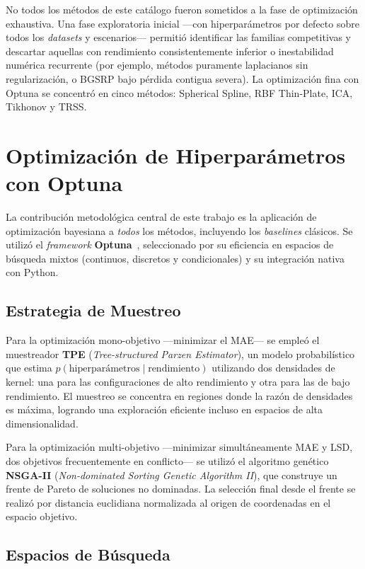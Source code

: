 No todos los métodos de este catálogo fueron sometidos a la fase de optimización exhaustiva. Una fase exploratoria inicial —con hiperparámetros por defecto sobre todos los \textit{datasets} y escenarios— permitió identificar las familias competitivas y descartar aquellas con rendimiento consistentemente inferior o inestabilidad numérica recurrente (por ejemplo, métodos puramente laplacianos sin regularización, o BGSRP bajo pérdida contigua severa). La optimización fina con Optuna se concentró en cinco métodos: Spherical Spline, RBF Thin-Plate, ICA, Tikhonov y TRSS.

\section{Optimización de Hiperparámetros con Optuna}

La contribución metodológica central de este trabajo es la aplicación de optimización bayesiana a \textit{todos} los métodos, incluyendo los \textit{baselines} clásicos. Se utilizó el \textit{framework} \textbf{Optuna}~\cite{akiba2019optuna}, seleccionado por su eficiencia en espacios de búsqueda mixtos (continuos, discretos y condicionales) y su integración nativa con Python.

\subsection{Estrategia de Muestreo}

Para la optimización mono-objetivo —minimizar el MAE— se empleó el muestreador \textbf{TPE} (\textit{Tree-structured Parzen Estimator}), un modelo probabilístico que estima $p(\text{hiperparámetros} \mid \text{rendimiento})$ utilizando dos densidades de kernel: una para las configuraciones de alto rendimiento y otra para las de bajo rendimiento. El muestreo se concentra en regiones donde la razón de densidades es máxima, logrando una exploración eficiente incluso en espacios de alta dimensionalidad.

Para la optimización multi-objetivo —minimizar simultáneamente MAE y LSD, dos objetivos frecuentemente en conflicto— se utilizó el algoritmo genético \textbf{NSGA-II} (\textit{Non-dominated Sorting Genetic Algorithm II}), que construye un frente de Pareto de soluciones no dominadas. La selección final desde el frente se realizó por distancia euclidiana normalizada al origen de coordenadas en el espacio objetivo.

\subsection{Espacios de Búsqueda}

